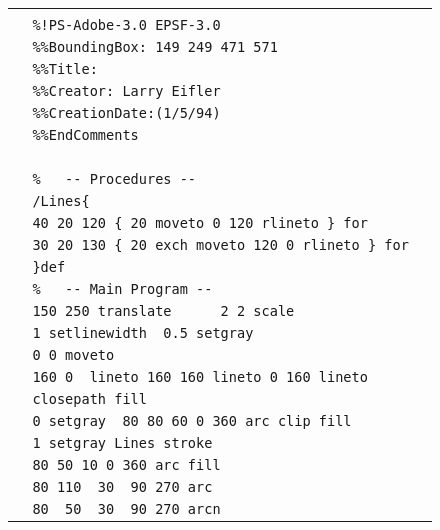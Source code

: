\begin{figure}[hbt]
\renewcommand{\arraystretch}{0.65}
\small
\begin{center}
\begin{tabular}{|l|}
\hline \\
\verb+  %!PS-Adobe-3.0 EPSF-3.0                           +\\ 
\verb+  %%BoundingBox: 149 249 471 571                    +\\ 
\verb+  %%Title:                                          +\\      
\verb+  %%Creator: Larry Eifler                           +\\ 
\verb+  %%CreationDate:(1/5/94)                           +\\ 
\verb+  %%EndComments                                     +\\     
\verb+                                                    +\\ 
\verb+  %   -- Procedures --                              +\\ 
\verb+  /Lines{                                           +\\ 
\verb+  40 20 120 { 20 moveto 0 120 rlineto } for         +\\ 
\verb+  30 20 130 { 20 exch moveto 120 0 rlineto } for    +\\ 
\verb+  }def                                              +\\ 
\verb+  %   -- Main Program --                            +\\ 
\verb+  150 250 translate      2 2 scale                  +\\ 
\verb+  1 setlinewidth  0.5 setgray                       +\\ 
\verb+  0 0 moveto                                        +\\ 
\verb+  160 0  lineto 160 160 lineto 0 160 lineto         +\\ 
\verb+  closepath fill                                    +\\  
\verb+  0 setgray  80 80 60 0 360 arc clip fill           +\\  
\verb+  1 setgray Lines stroke                            +\\ 
\verb+  80 50 10 0 360 arc fill                           +\\ 
\verb+  80 110  30  90 270 arc                            +\\ 
\verb+  80  50  30  90 270 arcn                           +\\ 

\end{tabular}
\end{center}
\end{figure}
